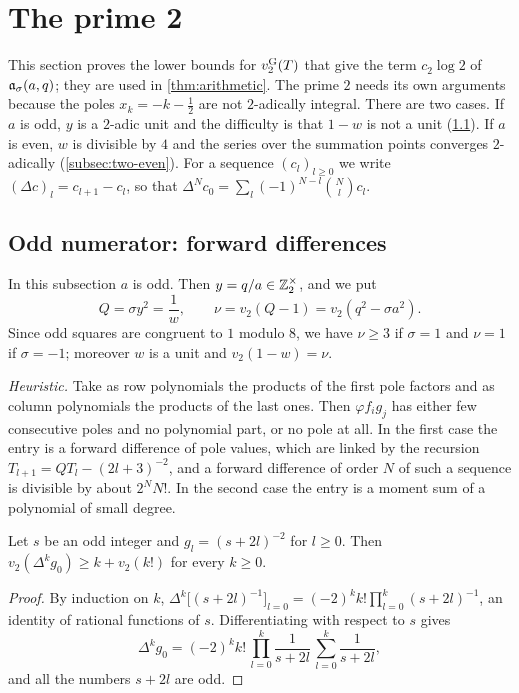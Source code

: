 \section{The prime 2}\label{sec:prime-two}

This section proves the lower bounds for $v_{2}^{\mathrm{G}}(T)$ that give the term $c_2\log2$ of
$\mathfrak{a}_\sigma(a,q)$; they are used in \cref{thm:arithmetic}. The prime $2$ needs its own
arguments because the poles $x_k=-k-\frac12$ are not $2$-adically integral. There are two
cases. If $a$ is odd, $y$ is a $2$-adic unit and the difficulty is that $1-w$ is not a unit
(\cref{subsec:two-odd}). If $a$ is even, $w$ is divisible by $4$ and the series over the
summation points converges $2$-adically (\cref{subsec:two-even}). For a sequence $(c_l)_{l\ge0}$
we write $(\Delta c)_l=c_{l+1}-c_l$, so that $\Delta^Nc_0=\sum_{l}(-1)^{N-l}\binom Nlc_l$.

\subsection{Odd numerator: forward differences}\label{subsec:two-odd}

In this subsection $a$ is odd. Then $y=q/a\in\mathbb{Z}_2^\times$, and we put
\[
  Q=\sigma y^2=\frac1w,\qquad \nu=v_2(Q-1)=v_2(q^2-\sigma a^2).
\]
Since odd squares are congruent to $1$ modulo $8$, we have $\nu\ge3$ if $\sigma=1$ and $\nu=1$
if $\sigma=-1$; moreover $w$ is a unit and $v_2(1-w)=\nu$.

\emph{Heuristic.} Take as row polynomials the products of the first pole factors and as column
polynomials the products of the last ones. Then $\varphi f_ig_j$ has either few consecutive
poles and no polynomial part, or no pole at all. In the first case the entry is a forward
difference of pole values, which are linked by the recursion $T_{l+1}=QT_l-(2l+3)^{-2}$, and a
forward difference of order $N$ of such a sequence is divisible by about $2^{N}N!$. In the
second case the entry is a moment sum of a polynomial of small degree.

\begin{lemma}\label{lem:fd-squares}
Let $s$ be an odd integer and $g_l=(s+2l)^{-2}$ for $l\ge0$. Then
$v_2(\Delta^kg_0)\ge k+v_2(k!)$ for every $k\ge0$.
\end{lemma}

\begin{proof}
By induction on $k$, $\Delta^k\bigl[(s+2l)^{-1}\bigr]_{l=0}=(-2)^kk!\prod_{l=0}^k(s+2l)^{-1}$,
an identity of rational functions of $s$. Differentiating with respect to $s$ gives
\[
  \Delta^kg_0=(-2)^kk!\,\prod_{l=0}^k\frac1{s+2l}\,\sum_{l=0}^k\frac1{s+2l},
\]
and all the numbers $s+2l$ are odd.
\end{proof}


